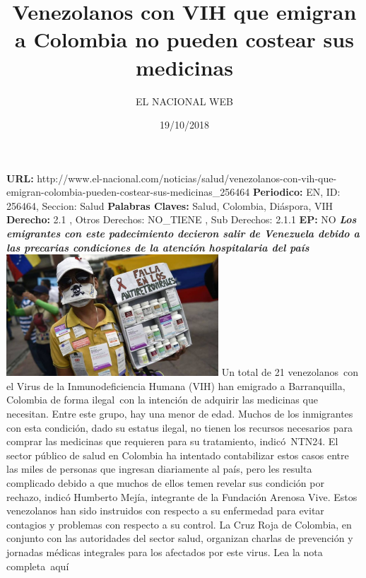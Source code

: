 \documentclass{article}%
\title{\textbf{Venezolanos con VIH que emigran a Colombia no pueden costear sus medicinas}}%
\author{EL NACIONAL WEB}%
\date{19/10/2018}%
\begin{document}
%
\normalsize%
\maketitle%
\textbf{URL: }%
http://www.el{-}nacional.com/noticias/salud/venezolanos{-}con{-}vih{-}que{-}emigran{-}colombia{-}pueden{-}costear{-}sus{-}medicinas\_256464\newline%
%
\textbf{Periodico: }%
EN, %
ID: %
256464, %
Seccion: %
Salud\newline%
%
\textbf{Palabras Claves: }%
Salud, Colombia, Diáspora, VIH\newline%
%
\textbf{Derecho: }%
2.1%
, Otros Derechos: %
NO\_TIENE%
, Sub Derechos: %
2.1.1%
\newline%
%
\textbf{EP: }%
NO\newline%
\newline%
%
\textbf{\textit{Los emigrantes con este padecimiento decieron salir de Venezuela debido a las precarias condiciones de la atención hospitalaria del país}}%
\newline%
\newline%
%
\includegraphics[width=300px]{173.jpg}%
\newline%
%
Un total de 21 venezolanos~con el Virus de la Inmunodeficiencia Humana (VIH) han emigrado a Barranquilla, Colombia de forma ilegal~con la intención de adquirir las medicinas que necesitan. Entre este grupo, hay una menor de edad.%
\newline%
%
Muchos de los inmigrantes con esta condición, dado su estatus ilegal, no tienen los recursos necesarios para comprar las medicinas que requieren para su tratamiento, indicó~NTN24.%
\newline%
%
El sector público de salud en Colombia ha intentado contabilizar estos casos entre las miles de personas que ingresan diariamente al país, pero les resulta complicado debido a que muchos de ellos temen revelar sus condición por rechazo, indicó Humberto Mejía, integrante de la Fundación Arenosa Vive.%
\newline%
%
Estos venezolanos han sido instruidos con respecto a su enfermedad para evitar contagios y problemas con respecto a su control.%
\newline%
%
La Cruz Roja de Colombia, en conjunto con las autoridades del sector salud, organizan charlas de prevención y jornadas médicas integrales para los afectados por este virus.%
\newline%
%
Lea la nota completa~aquí%
\newline%
%
\end{document}
